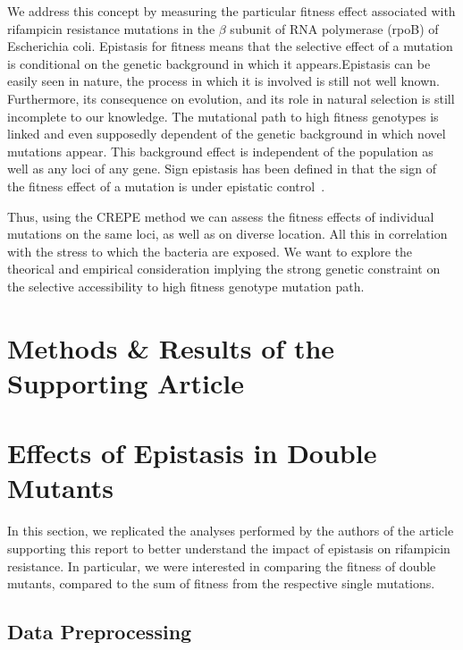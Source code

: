\documentclass[12pt]{article}
\begin{document}
  We address this concept by measuring the particular fitness effect associated
  with rifampicin resistance mutations in the $\beta$ subunit of RNA polymerase
  (rpoB) of Escherichia coli.  Epistasis for fitness means that the selective
  effect of a mutation is conditional on the genetic background in which it
  appears.Epistasis can be easily seen in nature, the process in which it is
  involved is still not well known. Furthermore, its consequence on evolution,
  and its role in natural selection is still incomplete to our knowledge. The
  mutational path to high fitness genotypes is linked and even supposedly
  dependent of the genetic background in which novel mutations appear. This
  background effect is independent of the population as well as any loci of any
  gene. Sign epistasis has been defined in that the sign of the fitness effect
  of a mutation is under epistatic control~\cite{garst2017genome}. 

  Thus, using the CREPE method we can assess the fitness effects of individual
  mutations on the same loci, as well as on diverse location. All this in
  correlation with the stress to which the bacteria are exposed. We want to
  explore the theorical and empirical consideration implying the strong genetic
  constraint on the selective accessibility to high fitness genotype mutation
  path.

  \section*{Methods \& Results of the Supporting Article}

  \section*{Effects of Epistasis in Double Mutants}

  In this section, we replicated the analyses performed by the authors of the
  article supporting this report to better understand the impact of epistasis
  on rifampicin resistance. In particular, we were interested in comparing the
  fitness of double mutants, compared to the sum of fitness from the respective
  single mutations.

  \subsection*{Data Preprocessing}
\end{document}
